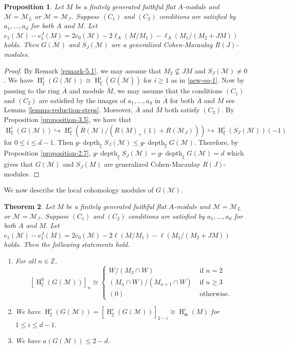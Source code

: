 \documentclass[11pt,reqno]{amsart}
\newtheorem{theorem}{Theorem}[section]
\newtheorem{proposition}[theorem]{Proposition}
\theoremstyle{definition}
\newcommand{\m}{\mathfrak m}
\def\M{{\mathcal M}}
\def\I{{\mathcal I}}
\DeclareMathOperator{\h}{H}
\DeclareMathOperator{\depth}{depth}
\numberwithin{equation}{section}
\begin{document}
 \begin{proposition}\label{theorem-5.2}
  Let $M$ be a finitely generated faithful flat $A$-module and $\M=\M_L$ or $\M=\M_\I.$ Suppose $(C_1)$ and $(C_2)$ conditions are satisfied by $a_1,\ldots,a_d$ for both $A$ and $M.$ Let  $e_1(\M)-e_1^J(M)=2e_0(\M)-2\ell_A(M/M_1)-\ell_A(M_1/(M_2+JM))$ holds. Then $G(\M)$ and  $S_J(\M)$ are a generalized Cohen-Macaulay $R(J)$-modules.
 \end{proposition}
 \begin{proof}
 	By Remark \ref{remark-5.1}, we may assume that $M_2\nsubseteq JM$ and $S_J(\M)\neq 0$. We have $\h_{\xi}^i(G(\M))\cong \h_{\xi}^i(G(\overline{\M}))$ for $i\geq 1$ as in \eqref{new-eq-1}.  Now by passing to the ring $\overline{A}$ and module $\overline{M}$, we may assume that the conditions $(C_1)$ and $(C_2)$ are satisfied by the images of $a_1,\ldots,a_d$ in $\overline{A}$ for both $\overline{A}$ and $\overline{M}$ see Lemma \ref{lemma-reduction-steps}. Moreover, $\overline{A}$ and $\overline{M}$ both satisfy $(C_3)$. By Proposition \ref{proposition-3.5}, we have that
 	$$\h_\xi^i(G(\M))\hookrightarrow \h_{\xi}^i(R(\M)/(R(M)_+(1)+R(\M_J)))\hookrightarrow \h_{\xi}^i(S_J(\M))(-1)$$
 	for $0\leq i\leq d-1$. Then $g\text{-}\depth_\xi S_J(\M)\leq g\text{-}\depth_\xi G(\M)$. Therefore, by Proposition 
 	\ref{proposition-2.7}, $g\text{-} \depth_\xi S_J(\M)=g\text{-} \depth_\xi G(\M)=d$ which gives that $G(\M)$ and $S_J(M)$ are generalized Cohen-Macaulay $R(J)$-modules.
 \end{proof}
We now describe the local cohomology modules of $G(\M)$.
\begin{theorem}\label{proposition-5.3}
  Let $M$ be a finitely generated faithful flat $A$-module and $\M=\M_L$ or $\M=\M_\I.$ Suppose $(C_1)$ and $(C_2)$ conditions are satisfied by $a_1,\ldots,a_d$ for both $A$ and $M.$
 Let $e_1(\M)-e_1^J(M)=2e_0(\M)-2\ell(M/M_1)-\ell(M_1/(M_2+JM))$ holds. Then the following statements hold.
	\begin{enumerate}[label=(\roman*)]
		\item\label{Proposition-5.3-item1} For all $n\in\mathbb{Z},$
		$$[\h^0_\xi(G(\M))]_n\cong \begin{cases}
			W/(M_3\cap W) &\mbox{ if } n=2\\
			(M_n\cap W)/(M_{n+1}\cap W) &\mbox{ if } n\geq 3\\
			(0) & \mbox{ otherwise. } 
		\end{cases}    
		$$
		\item\label{Proposition-5.3-item2} We have $\h^i_\xi(G(\M))=[\h^i_\xi(G(\M))]_{2-i}\cong \h_\m^i(M)$ for $1\leq i\leq d-1.$
		\item\label{Proposition-5.3-item3} We have $a(G(\M))\leq 2-d.$
	\end{enumerate}
\end{theorem}
\end{document}
